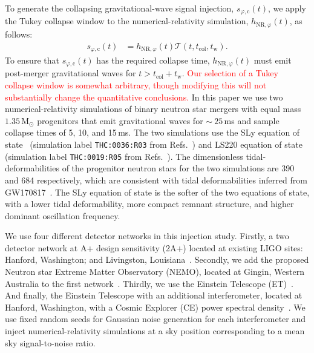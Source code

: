 \documentclass[
reprint,
prd,
twocolumn,
nofootinbib,
 amsmath,
showpacs ,amssymb, aps,%
superscriptaddress
]{revtex4-1}
\newcommand{\red}[1]{\textcolor{red}{#1}}
\newcommand{\tc}{t_{\mathrm{col}}}
\newcommand{\tw}{t_{\mathrm{w}}}
\begin{document}
    To generate the collapsing gravitational-wave signal injection, $s_{\varphi,\mathrm{c}}(t)$, we apply the Tukey collapse window to the numerical-relativity simulation, $h_{\mathrm{NR},\varphi}(t)$, as follows: 
    \begin{align}
        s_{\varphi,\mathrm{c}}(t) & =  h_{\mathrm{NR},\varphi}(t)\mathcal{T}\left(t , \tc,\tw\right). \label{eq:scol}
    \end{align}
    To ensure that $s_{\varphi,\mathrm{c}}(t)$ has the required collapse time, $h_{\mathrm{NR},\varphi}(t)$ must emit post-merger gravitational waves for $t>\tc+\tw$.
    \red{Our selection of a Tukey collapse window is somewhat arbitrary, though modifying this will not substantially change the quantitative conclusions.}
    In this paper we use two numerical-relativity simulations of binary neutron star mergers with equal mass $1.35\,\mathrm{M}_\odot$ progenitors that emit gravitational waves for $\sim~25$\,ms and sample collapse times of 5, 10, and 15\,ms.
    The two simulations use the SLy equation of state~\cite{Douchin2001} (simulation label \texttt{THC:0036:R03} from Refs.~\cite{Dietrich2018,Radice2016}) and LS220 equation of state~\cite{Lattimer1991} (simulation label \texttt{THC:0019:R05} from Refs.~\cite{Dietrich2018,Radice2017}).
    The dimensionless tidal-deformabilities of the progenitor neutron stars for the two simulations are 390 and 684 respectively, which are consistent with tidal deformabilities inferred from GW170817~\cite{GW170817Properties}.
    The SLy equation of state is the softer of the two equations of state, with a lower tidal deformability, more compact remnant structure, and higher dominant oscillation frequency.\par
    
    We use four different detector networks in this injection study.
    Firstly, a two detector network at A+ design sensitivity (2A+) located at existing LIGO sites: Hanford, Washington; and Livingston, Louisiana~\cite{Abbott2020Prospects,PSD:Aplus}. 
    Secondly, we add the proposed Neutron star Extreme Matter Observatory (NEMO), located at Gingin, Western Australia to the first network~\cite{NEMO2020}.
    Thirdly, we use the Einstein Telescope (ET)~\cite{Hild2008,Punturo2010,Hild2011, PSD:ET}.
    And finally, the Einstein Telescope with an additional interferometer, located at Hanford, Washington, with a Cosmic Explorer (CE) power spectral density~\cite{Abbott2017b, Adhikari2019,PSD:CE}.
    We use fixed random seeds for Gaussian noise generation for each interferometer and inject numerical-relativity simulations at a sky position corresponding to a mean sky signal-to-noise ratio. 
    \par
      
\end{document}

